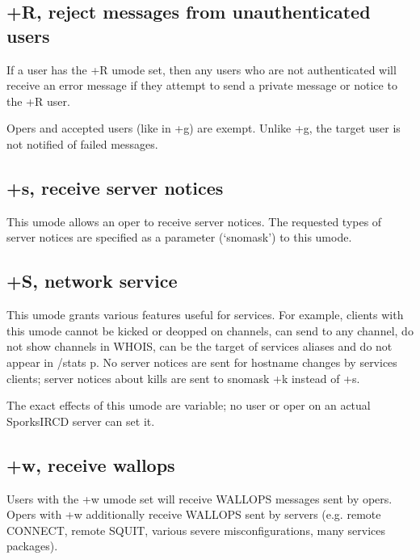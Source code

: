 \subsection{+R, reject messages from unauthenticated users}

	If a user has the +R umode set, then any users who are not
	authenticated will receive an error message if they attempt to send a
	private message or notice to the +R user.
 

	Opers and accepted users (like in +g) are exempt. Unlike +g, the target
	user is not notified of failed messages.


\subsection{+s, receive server notices}

	This umode allows an oper to receive server notices. The requested
	types of server notices are specified as a parameter (`snomask') to
	this umode.


\subsection{+S, network service}

	This umode grants various features useful for services. For example,
	clients with this umode cannot be kicked or deopped on channels, can
	send to any channel, do not show channels in WHOIS, can be the target
	of services aliases and do not appear in /stats p. No server notices
	are sent for hostname changes by services clients; server notices about
	kills are sent to snomask +k instead of +s.

	The exact effects of this umode are variable; no user or oper on an
	actual SporksIRCD server can set it.
 

\subsection{+w, receive wallops}

	Users with the +w umode set will receive WALLOPS messages sent by
	opers. Opers with +w additionally receive WALLOPS sent by servers (e.g.
	remote CONNECT, remote SQUIT, various severe misconfigurations,	many
	services packages).



